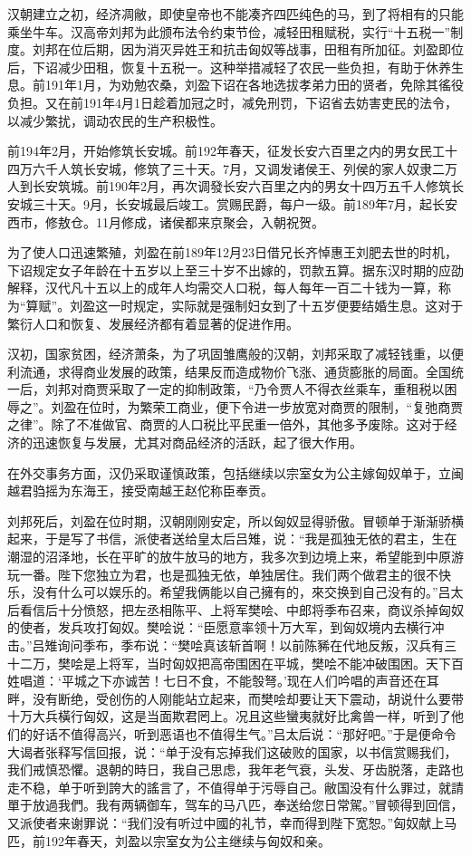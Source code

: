 汉朝建立之初，经济凋敝，即使皇帝也不能凑齐四匹纯色的马，到了将相有的只能乘坐牛车。汉高帝刘邦为此颁布法令约束节俭，减轻田租赋税，实行“十五税一”制度。刘邦在位后期，因为消灭异姓王和抗击匈奴等战事，田租有所加征。刘盈即位后，下诏减少田租，恢复十五税一。这种举措减轻了农民一些负担，有助于休养生息。前191年1月，为劝勉农桑，刘盈下诏在各地选拔孝弟力田的贤者，免除其徭役负担。又在前191年4月1日趁着加冠之时，减免刑罚，下诏省去妨害吏民的法令，以减少繁扰，调动农民的生产积极性。

前194年2月，开始修筑长安城。前192年春天，征发长安六百里之内的男女民工十四万六千人筑长安城，修筑了三十天。7月，又调发诸侯王、列侯的家人奴隶二万人到长安筑城。前190年2月，再次调發长安六百里之内的男女十四万五千人修筑长安城三十天。9月，长安城最后竣工。赏赐民爵，每户一级。前189年7月，起长安西市，修敖仓。11月修成，诸侯都来京聚会，入朝祝贺。

为了使人口迅速繁殖，刘盈在前189年12月23日借兄长齐悼惠王刘肥去世的时机，下诏规定女子年龄在十五岁以上至三十岁不出嫁的，罚款五算。据东汉时期的应劭解释，汉代凡十五以上的成年人均需交人口税，每人每年一百二十钱为一算，称为“算赋”。刘盈这一时规定，实际就是强制妇女到了十五岁便要结婚生息。这对于繁衍人口和恢复、发展经济都有着显著的促进作用。

汉初，国家贫困，经济萧条，为了巩固雏鹰般的汉朝，刘邦采取了减轻钱重，以便利流通，求得商业发展的政策，结果反而造成物价飞涨、通货膨胀的局面。全国统一后，刘邦对商贾采取了一定的抑制政策，“乃令贾人不得衣丝乘车，重租税以困辱之”。刘盈在位时，为繁荣工商业，便下令进一步放宽对商贾的限制，“复弛商贾之律”。除了不准做官、商贾的人口税比平民重一倍外，其他多予废除。这对于经济的迅速恢复与发展，尤其对商品经济的活跃，起了很大作用。

在外交事务方面，汉仍采取谨慎政策，包括继续以宗室女为公主嫁匈奴单于，立闽越君驺摇为东海王，接受南越王赵佗称臣奉贡。

刘邦死后，刘盈在位时期，汉朝刚刚安定，所以匈奴显得骄傲。冒顿单于渐渐骄横起来，于是写了书信，派使者送给皇太后吕雉，说：“我是孤独无依的君主，生在潮湿的沼泽地，长在平旷的放牛放马的地方，我多次到边境上来，希望能到中原游玩一番。陛下您独立为君，也是孤独无依，单独居住。我们两个做君主的很不快乐，没有什么可以娱乐的。希望我俩能以自己擁有的，來交换到自己没有的。”吕太后看信后十分愤怒，把左丞相陈平、上将军樊哙、中郎将季布召来，商议杀掉匈奴的使者，发兵攻打匈奴。樊哙说：“臣愿意率领十万大军，到匈奴境内去横行冲击。”吕雉询问季布，季布说：“樊哙真该斩首啊！以前陈豨在代地反叛，汉兵有三十二万，樊哙是上将军，当时匈奴把高帝围困在平城，樊哙不能冲破围困。天下百姓唱道：‘平城之下亦诚苦！七日不食，不能彀弩。’现在人们吟唱的声音还在耳畔，没有断绝，受创伤的人刚能站立起来，而樊哙却要让天下震动，胡说什么要带十万大兵橫行匈奴，这是当面欺君罔上。况且这些蠻夷就好比禽兽一样，听到了他们的好话不值得高兴，听到恶语也不值得生气。”吕太后说：“那好吧。”于是便命令大谒者张释写信回报，说：“单于没有忘掉我们这破败的国家，以书信赏赐我们，我们戒慎恐懼。退朝的時日，我自己思虑，我年老气衰，头发、牙齿脱落，走路也走不稳，单于听到誇大的謠言了，不值得单于污辱自己。敝国没有什么罪过，就請單于放過我們。我有两辆御车，驾车的马八匹，奉送给您日常駕。”冒顿得到回信，又派使者来谢罪说：“我们没有听过中國的礼节，幸而得到陛下宽恕。”匈奴献上马匹，前192年春天，刘盈以宗室女为公主继续与匈奴和亲。

